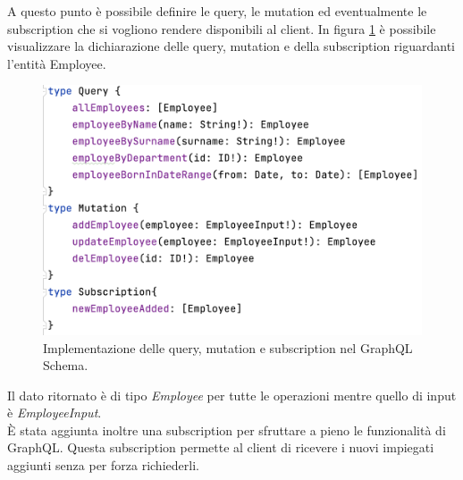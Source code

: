 A questo punto è possibile definire le query, le mutation ed eventualmente le subscription che si vogliono rendere disponibili al client. In figura \ref{query-employee} è possibile visualizzare la dichiarazione delle query, mutation e della subscription riguardanti l'entità Employee.
\FloatBarrier
\begin{figure}[!ht]
\centering
\includegraphics[width=0.6\linewidth]{immagini/queryEmployee.png}
\caption{Implementazione delle query, mutation e subscription nel GraphQL Schema.}
\label{query-employee}
\end{figure}
\FloatBarrier
Il dato ritornato è di tipo \textit{Employee} per tutte le operazioni mentre quello di input è \textit{EmployeeInput}.\\
È stata aggiunta inoltre una subscription per sfruttare a pieno le funzionalità di GraphQL. Questa subscription permette al client di ricevere i nuovi impiegati aggiunti senza per forza richiederli.
